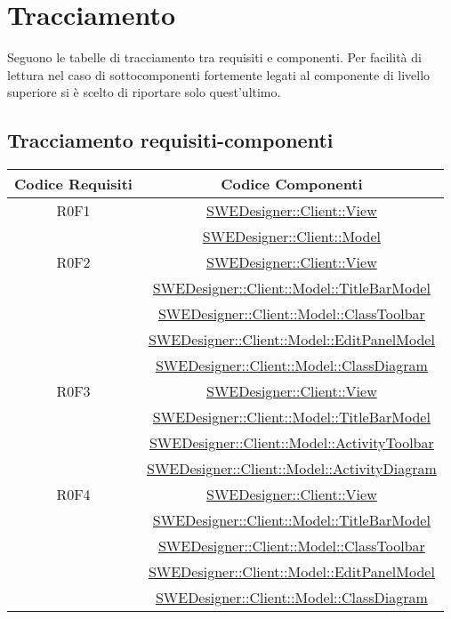 \documentclass[../SpecificaTecnica.tex]{subfiles}
\begin{document}
	\section{Tracciamento}
	Seguono le tabelle di tracciamento tra requisiti e componenti.
	Per facilità di lettura nel caso di sottocomponenti fortemente legati al componente di livello superiore si è scelto di riportare solo quest'ultimo.
		
	\subsection{Tracciamento requisiti-componenti}
	\normalsize
	\begin{longtable}{|c|c|}
		\hline
		\textbf{Codice Requisiti} & \textbf{Codice Componenti} \\
		\hline
		\endhead
		R0F1 & \hyperlink{SWEDesigner::Client::View}{SWEDesigner::Client::View}
		\\& \hyperlink{SWEDesigner::Client::Model}{SWEDesigner::Client::Model}\\\hline
		R0F2 & \hyperlink{SWEDesigner::Client::View}{SWEDesigner::Client::View} \\& \hyperlink{SWEDesigner::Client::Model::TitleBarModel}{SWEDesigner::Client::Model::TitleBarModel} \\& \hyperlink{SWEDesigner::Client::Model::ClassToolbar}{SWEDesigner::Client::Model::ClassToolbar} \\& \hyperlink{SWEDesigner::Client::Model::EditPanelModel}{SWEDesigner::Client::Model::EditPanelModel} \\& \hyperlink{SWEDesigner::Client::Model::ClassDiagram}{SWEDesigner::Client::Model::ClassDiagram} \\\hline
		R0F3 & \hyperlink{SWEDesigner::Client::View}{SWEDesigner::Client::View} \\& \hyperlink{SWEDesigner::Client::Model::TitleBarModel}{SWEDesigner::Client::Model::TitleBarModel} \\& \hyperlink{SWEDesigner::Client::Model::ActivityToolbar}{SWEDesigner::Client::Model::ActivityToolbar} \\& \hyperlink{SWEDesigner::Client::Model::ActivityDiagram}{SWEDesigner::Client::Model::ActivityDiagram} \\\hline
		R0F4 & \hyperlink{SWEDesigner::Client::View}{SWEDesigner::Client::View} \\& \hyperlink{SWEDesigner::Client::Model::TitleBarModel}{SWEDesigner::Client::Model::TitleBarModel} \\& \hyperlink{SWEDesigner::Client::Model::ClassToolbar}{SWEDesigner::Client::Model::ClassToolbar} \\& \hyperlink{SWEDesigner::Client::Model::EditPanelModel}{SWEDesigner::Client::Model::EditPanelModel} \\& \hyperlink{SWEDesigner::Client::Model::ClassDiagram}{SWEDesigner::Client::Model::ClassDiagram} \\\hline

\end{longtable}
\end{document}
